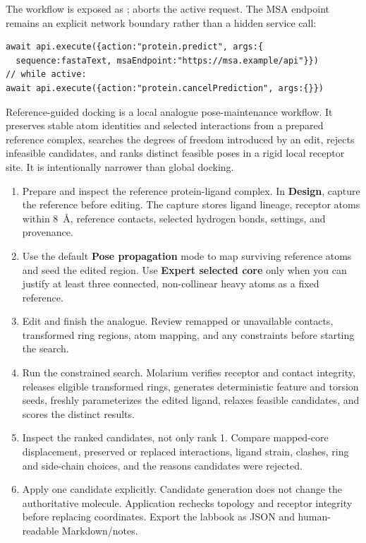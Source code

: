 \documentclass[11pt]{article}
\begin{document}
The workflow is exposed as ;  aborts the active request. The MSA endpoint remains an explicit network boundary rather than a hidden service call:

\begin{lstlisting}
await api.execute({action:"protein.predict", args:{
  sequence:fastaText, msaEndpoint:"https://msa.example/api"}})
// while active:
await api.execute({action:"protein.cancelPrediction", args:{}})
\end{lstlisting}


Reference-guided docking is a local analogue pose-maintenance workflow. It preserves stable atom identities and selected interactions from a prepared reference complex, searches the degrees of freedom introduced by an edit, rejects infeasible candidates, and ranks distinct feasible poses in a rigid local receptor site. It is intentionally narrower than global docking.


\begin{enumerate}
\item Prepare and inspect the reference protein-ligand complex. In \textbf{Design}, capture the reference before editing. The capture stores ligand lineage, receptor atoms within 8~\AA, reference contacts, selected hydrogen bonds, settings, and provenance.
\item Use the default \textbf{Pose propagation} mode to map surviving reference atoms and seed the edited region. Use \textbf{Expert selected core} only when you can justify at least three connected, non-collinear heavy atoms as a fixed reference.
\item Edit and finish the analogue. Review remapped or unavailable contacts, transformed ring regions, atom mapping, and any constraints before starting the search.
\item Run the constrained search. Molarium verifies receptor and contact integrity, releases eligible transformed rings, generates deterministic feature and torsion seeds, freshly parameterizes the edited ligand, relaxes feasible candidates, and scores the distinct results.
\item Inspect the ranked candidates, not only rank 1. Compare mapped-core displacement, preserved or replaced interactions, ligand strain, clashes, ring and side-chain choices, and the reasons candidates were rejected.
\item Apply one candidate explicitly. Candidate generation does not change the authoritative molecule. Application rechecks topology and receptor integrity before replacing coordinates. Export the labbook as JSON and human-readable Markdown/notes.
\end{enumerate}
\end{document}

